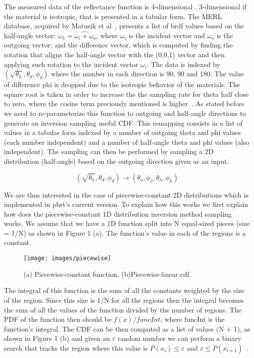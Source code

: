 \documentclass[conference]{acmsiggraph}
\begin{document}
The measured data of the reflectance function is 4-dimensional , 3-dimensional if the material is isotropic, that is presented in a tabular form. The MERL database, acquired by Matusik et al~\cite{Matusik:2003:ADR}, presents a list of brdf values based on the half-angle vector: $\omega_{h} = \widehat{\omega_{i} + \omega_{o}}$, where $\omega_{i}$ is the incident vector and $\omega_{o}$ is the outgoing vector; and the difference vector, which is computed by finding the rotation that aligns the half-angle vector with the (0,0,1) vector and then applying such rotation to the incident vector $\omega_{i}$. The data is indexed by $(\sqrt{\theta_{h}}, \theta_{d}, \phi_{d})$ where the number in each direction is 90, 90 and 180. The value of difference phi is dropped due to the isotropic behavior of the materials. The square root is taken in order to increase the the sampling rate for theta half close  to zero, where the cosine term preciously mentioned is higher~\cite{Pharr:2010:PBR}. As stated before we need to re-parameterize this function to outgoing and half-angle directions to generate an inversion sampling useful CDF.  This remapping consists in a list of values in a tabular form indexed by a number of outgoing theta and phi values (each number independent) and a number of half-angle theta and phi values (also independent). The sampling can then be performed by sampling a 2D distribution (half-angle) based on the outgoing direction given as an input.

\begin{equation}
(\sqrt{\theta_{h}}, \theta_{d}, \phi_{d}) \rightarrow (\theta_{o}, \phi_{o}, \theta_{h}, \phi_{h})
\end{equation}

We are thus interested in the case of piecewise-constant 2D distributions which is implemented in pbrt's current version. To explain how this works we first explain how does the piecewise-constant 1D distribution inversion method sampling works. We assume that we have a 1D function split into N equal-sized pieces (size = 1/N) as shown in Figure 1 (a). The function's value in each of the regions is a constant. 

\begin{figure}[ht]
  \centering
  \texttt{[image: images/piecewise]}
  \caption{(a) Piecewise-constant function. (b)Piecewise-linear cdf.}
\end{figure}

The integral of this function is the sum of all the constants weighted by the size of the region. Since this size is 1/N for all the regions then the integral becomes the sum of all the values of the function divided by the number of regions. The PDF of the function then should be $f(x)/funcInt$, where funcInt is the function's integral. The CDF can be then computed as a list of values (N + 1), as shown in Figure 1 (b) and given an $\varepsilon$ random number we can perform a binary search that tracks the region where this value is $P(x_{i}) \leq \varepsilon$ and $\varepsilon \leq P(x_{i+1})$~\cite{Pharr:2010:PBR}.
\end{document}
